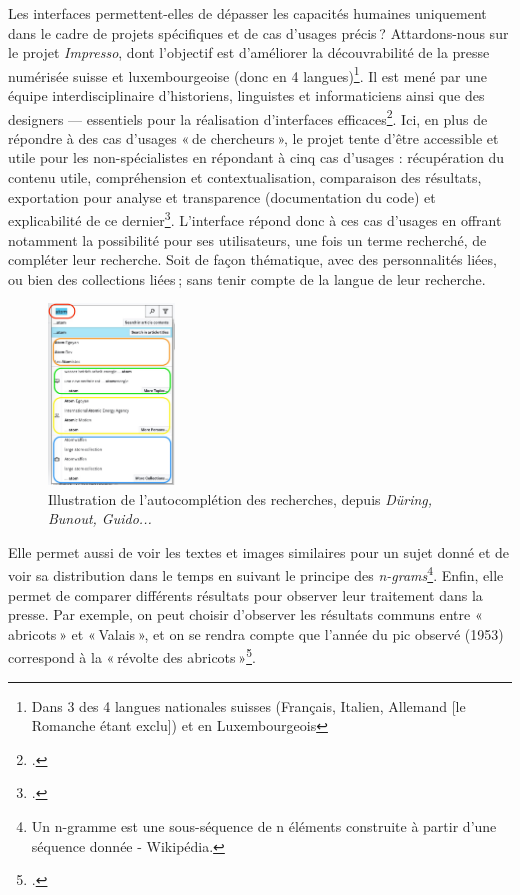 Les interfaces permettent-elles de dépasser les capacités humaines uniquement dans le cadre de projets spécifiques et de cas d’usages précis ? Attardons-nous sur le projet \textit{Impresso}, dont l’objectif est d’améliorer la découvrabilité de la presse numérisée suisse et luxembourgeoise (donc en 4 langues)\footnote{Dans 3 des 4 langues nationales suisses (Français, Italien, Allemand [le Romanche étant exclu]) et en Luxembourgeois}. Il est mené par une équipe interdisciplinaire d’historiens, linguistes et informaticiens ainsi que des designers — essentiels pour la réalisation d’interfaces efficaces\footcite{ehrmann_explorer_2021}. Ici, en plus de répondre à des cas d’usages « de chercheurs », le projet tente d’être accessible et utile pour les non-spécialistes en répondant à cinq cas d’usages : récupération du contenu utile, compréhension et contextualisation, comparaison des résultats, exportation pour analyse et transparence (documentation du code) et explicabilité de ce dernier\footcite[pp. 5-7]{during_transparent_2024}. L’interface répond donc à ces cas d’usages en offrant notamment la possibilité pour ses utilisateurs, une fois un terme recherché, de compléter leur recherche. Soit de façon thématique, avec des personnalités liées, ou bien des collections liées ; sans tenir compte de la langue de leur recherche.

\begin{figure}[h!]
	\centering
	\includegraphics[width=0.3\textwidth]{images/image16.png}
	\caption{Illustration de l'autocomplétion des recherches, depuis \textit{Düring, Bunout, Guido...}}
	\label{fig:image16}
\end{figure}
\newpage

Elle permet aussi de voir les textes et images similaires pour un sujet donné et de voir sa distribution dans le temps en suivant le principe des \textit{n-grams}\footnote{ Un n-gramme est une sous-séquence de n éléments construite à partir d'une séquence donnée - Wikipédia. }. Enfin, elle permet de comparer différents résultats pour observer leur traitement dans la presse. Par exemple, on peut choisir d’observer les résultats communs entre « abricots » et « Valais », et on se rendra compte que l’année du pic observé (1953) correspond à la « révolte des abricots »\footcite{noauthor_revolte_2018}.

